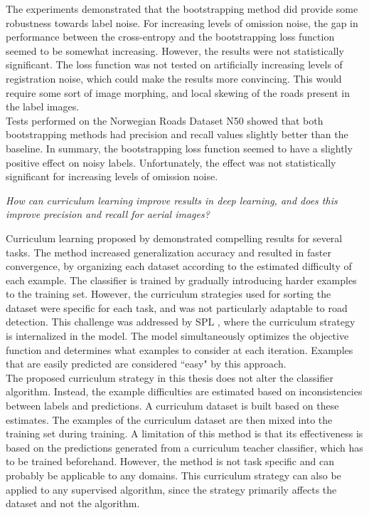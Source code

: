 The experiments demonstrated that the bootstrapping method did provide some robustness towards label noise. For increasing levels of omission noise, the gap in performance between the cross-entropy and the bootstrapping loss function seemed to be somewhat increasing. However, the results were not statistically significant. The loss function was not tested on artificially increasing levels of registration noise, which could make the results more convincing. This would require some sort of image morphing, and local skewing of the roads present in the label images. \\

Tests performed on the Norwegian Roads Dataset N50 showed that both bootstrapping methods had precision and recall values slightly better than the baseline. In summary, the bootstrapping loss function seemed to have a slightly positive effect on noisy labels. Unfortunately, the effect was not statistically significant for increasing levels of omission noise. 

\begin{description}[ style=nextline, leftmargin=1.5em, rightmargin=1.5em]
\item[Research question 2:]{\it How can curriculum learning improve results in deep learning, and does this improve precision and recall for aerial images?}
\end{description}

Curriculum learning proposed by \cite{Bengio_curriculumlearning} demonstrated compelling results for several tasks. The method increased generalization accuracy and resulted in faster convergence, by organizing each dataset according to the estimated difficulty of each example. The classifier is trained by gradually introducing harder examples to the training set. However, the curriculum strategies used for sorting the dataset were specific for each task, and was not particularly adaptable to road detection. This challenge was addressed by \ac{SPL} \citep{Kumar_self_paced_learning}, where the curriculum strategy is internalized in the model. The model simultaneously optimizes the objective function and determines what examples to consider at each iteration. Examples that are easily predicted are considered ``easy" by this approach.\\

The proposed curriculum strategy in this thesis does not alter the classifier algorithm. Instead, the example difficulties are estimated based on inconsistencies between labels and predictions. A curriculum dataset is built based on these estimates. The examples of the curriculum dataset are then mixed into the training set during training. A limitation of this method is that its effectiveness is based on the predictions generated from a curriculum teacher classifier, which has to be trained beforehand. However, the method is not task specific and can probably be applicable to any domains. This curriculum strategy can also be applied to any supervised algorithm, since the strategy primarily affects the dataset and not the algorithm. \\


